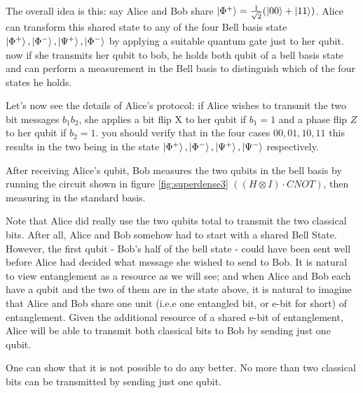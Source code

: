 The overall idea is this: say Alice and Bob share $\ket{\Phi^{+}}=\frac{1}{\sqrt{2}}(\ket{00}+\ket{11})$. Alice can transform this shared state to any of the four Bell basis state $\ket{\Phi^{+}},\ket{\Phi^{-}},\ket{\Psi^{+}},\ket{\Phi^{-}}$ by applying a suitable quantum gate just to her qubit. now if she transmits her qubit to bob, he holds both qubit of a bell basis state and can perform a measurement in the Bell basis to distinguish which of the four states he holds.

Let's now see the details of Alice's protocol: if Alice wishes to transmit the two bit messages $b_1b_2$, she applies a bit flip X to her qubit if $b_1=1$ and a phase flip $Z$ to her qubit if $b_2=1$. you should verify that in the four cases $00,01,10,11$ this results in the two being in the state $\ket{\Phi^{+}},\ket{\Phi^{-}},\ket{\Psi^{+}},\ket{\Psi^{-}}$ respectively.

After receiving Alice's qubit, Bob measures the two qubits in the bell basis by running the circuit shown in figure \ref{fig:superdense3} $((H\otimes I) \cdot CNOT)$, then measuring in the standard basis.

Note that Alice did really use the two qubits total to transmit the two classical bits. After all, Alice and Bob somehow had to start with a shared Bell State. However, the first qubit - Bob's half of the bell state - could have been sent well before Alice had decided what message she wished to send to Bob. It is natural to view entanglement as a resource as we will see; and when Alice and Bob each have a qubit and the two of them are in the state above, it is natural to imagine that Alice and Bob share one unit (i.e.e one entangled bit, or e-bit for short) of entanglement. Given the additional resource of a shared e-bit of entanglement, Alice will be able to transmit both classical bits to Bob by sending just one qubit.

One can show that it is not possible to do any better. No more than two classical bits can be transmitted by sending just one qubit.

